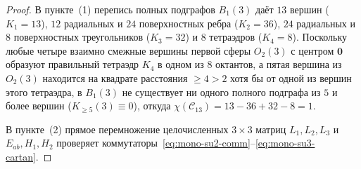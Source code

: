\begin{proof}
В пункте~(1) перепись полных подграфов $B_1(3)$ даёт $13$ вершин ($K_1 = 13$), $12$ радиальных и $24$ поверхностных ребра ($K_2 = 36$), $24$ радиальных и $8$ поверхностных треугольников ($K_3 = 32$) и $8$ тетраэдров ($K_4 = 8$). Поскольку любые четыре взаимно смежные вершины первой сферы $O_2(3)$ с центром $\mathbf{0}$ образуют правильный тетраэдр $K_4$ в одном из $8$ октантов, а пятая вершина из $O_2(3)$ находится на квадрате расстояния $\ge 4 > 2$ хотя бы от одной из вершин этого тетраэдра, в $B_1(3)$ не существует ни одного полного подграфа из $5$ и более вершин ($K_{\ge 5}(3) \equiv 0$), откуда $\chi(\mathcal{C}_{13}) = 13 - 36 + 32 - 8 = 1$.

В пункте~(2) прямое перемножение целочисленных $3\times 3$ матриц $L_1, L_2, L_3$ и $E_{ab}, H_1, H_2$ проверяет коммутаторы~\eqref{eq:mono-su2-comm}--\eqref{eq:mono-su3-cartan}.


\end{proof}
